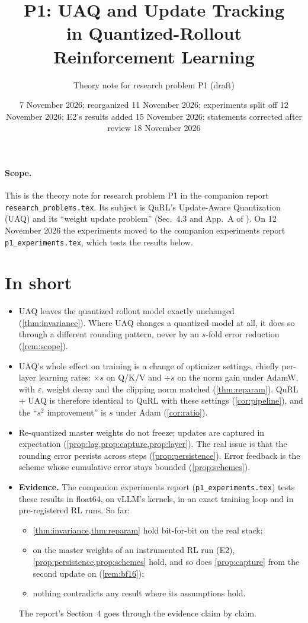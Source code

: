 \documentclass[11pt]{article}
\title{P1: UAQ and Update Tracking\\in Quantized-Rollout Reinforcement Learning}
\author{Theory note for research problem P1 (draft)}
\date{7 November 2026; reorganized 11 November 2026; experiments split off 12 November 2026; E2's results added 15 November 2026; statements corrected after review 18 November 2026}
\begin{document}
\maketitle

\paragraph{Scope.} This is the theory note for research problem P1 in the companion report \texttt{research\_problems.tex}. Its subject is QuRL's Update-Aware Quantization (UAQ) and its ``weight update problem'' (Sec.~4.3 and App.~A of \citealp{li2026qurl}). On 12 November 2026 the experiments moved to the companion experiments report \texttt{p1\_experiments.tex}, which tests the results below.

\section*{In short}
\begin{itemize}
\item UAQ leaves the quantized rollout model exactly unchanged (\cref{thm:invariance}). Where UAQ changes a quantized model at all, it does so through a different rounding pattern, never by an $s$-fold error reduction (\cref{rem:scope}).
\item UAQ's whole effect on training is a change of optimizer settings, chiefly per-layer learning rates: $\times s$ on Q/K/V and $\div s$ on the norm gain under AdamW, with $\varepsilon$, weight decay and the clipping norm matched (\cref{thm:reparam}). QuRL + UAQ is therefore identical to QuRL with these settings (\cref{cor:pipeline}), and the ``$s^2$ improvement'' is $s$ under Adam (\cref{cor:ratio}).
\item Re-quantized master weights do not freeze; updates are captured in expectation (\cref{prop:lag,prop:capture,prop:layer}). The real issue is that the rounding error persists across steps (\cref{prop:persistence}). Error feedback is the scheme whose cumulative error stays bounded (\cref{prop:schemes}).
\item \textbf{Evidence.} The companion experiments report (\texttt{p1\_experiments.tex}) tests these results in float64, on vLLM's kernels, in an exact training loop and in pre-registered RL runs. So far:
  \begin{itemize}
  \item \cref{thm:invariance,thm:reparam} hold bit-for-bit on the real stack;
  \item on the master weights of an instrumented RL run (E2), \cref{prop:persistence,prop:schemes} hold, and so does \cref{prop:capture} from the second update on (\cref{rem:bf16});
  \item nothing contradicts any result where its assumptions hold.
  \end{itemize}
  The report's Section~4 goes through the evidence claim by claim.
\end{itemize}
\end{document}
